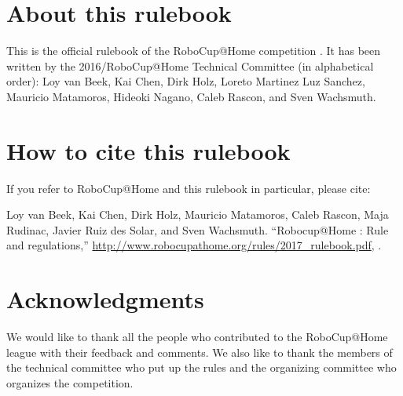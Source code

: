 


\section*{About this rulebook}
This is the official rulebook of the RoboCup@Home competition \YEAR.
It has been written by the 2016/\YEAR RoboCup@Home Technical Committee (in alphabetical order): 
Loy van Beek, 
Kai Chen, 
Dirk Holz,  
Loreto Martinez Luz Sanchez, 
Mauricio Matamoros, 
Hideoki Nagano,
Caleb Rascon, and 
Sven Wachsmuth.

\section*{How to cite this rulebook}
If you refer to RoboCup@Home and this rulebook in particular, please cite:

Loy van Beek, Kai Chen, Dirk Holz, Mauricio Matamoros, Caleb Rascon, Maja Rudinac, Javier Ruiz des Solar, and Sven Wachsmuth. 
``Robocup@Home \YEAR: Rule and regulations,'' 
\url{http://www.robocupathome.org/rules/2017_rulebook.pdf}, \YEAR.



\section*{Acknowledgments}
\label{sec:acknowledgments}


We would like to thank all the people who contributed to the RoboCup@Home league 
with their feedback and comments. 
We also like to thank the members of the technical committee who put up the rules
and the organizing committee who organizes the competition.  

